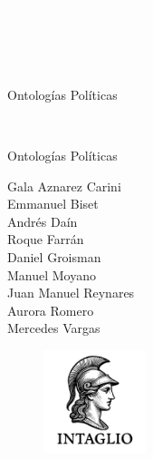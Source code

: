 \newpage
\thispagestyle{empty}
{\textcolor{white}{.}}

\newpage
\thispagestyle{empty}
{\textcolor{white}{.}}

\newpage
\thispagestyle{empty}
{\textcolor{white}{.}}

\vspace{30mm}

\begin{center}
	\LARGE{Ontologías Políticas}
\end{center}

\newpage
\thispagestyle{empty}
{\textcolor{white}{.}}

\newpage
\thispagestyle{empty}

\vspace{30mm}

\begin{center}
	\LARGE{Ontologías Políticas}\\\vspace{10mm}

	\Large{}
\end{center}

\vspace{10mm}

\begin{center}%
{\sc\large{Gala Aznarez Carini\\
		Emmanuel Biset\\
		Andrés Daín\\
		Roque Farrán\\
		Daniel Groisman\\
		Manuel Moyano\\
		Juan Manuel Reynares\\
		Aurora Romero\\
		Mercedes Vargas\\}}
\end{center}




\vfill

\begin{figure}[b]
\centering
\includegraphics[width=30mm]{./media/logo-imago-ByW.png}
\end{figure}

